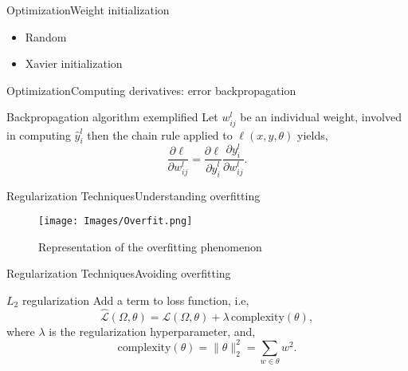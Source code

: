 \documentclass{beamer}
\newcommand{\loss}{\mathcal{L}}
\begin{document}
\begin{frame}{Optimization}{Weight initialization}
  \begin{itemize}
    \item Random
    \item Xavier initialization
  \end{itemize}
\end{frame}

\begin{frame}{Optimization}{Computing derivatives: error backpropagation}
  \begin{block}{Backpropagation algorithm exemplified}
    Let \(w_ {ij} ^ l\) be an individual weight, involved in computing
    \(\hat{y}_i^l\) then the \alert{chain rule} applied to
    \(\ell (x, y, \theta)\) yields,
    \begin{equation}
      \frac{\partial \ell}{\partial w_{ij}^l} =
      \frac{\partial \ell}{\partial \hat{y}_i^l}
      \frac{\partial y_i^l}{\partial w_{ij}^l}.
    \end{equation}
  \end{block}
  \begin{center}
    \resizebox{.6\textwidth}{!}{
      
    }
  \end{center}
\end{frame}

\begin{frame}{Regularization Techniques}{Understanding overfitting}
  \begin{figure}
    \texttt{[image: Images/Overfit.png]}
    \caption{Representation of the overfitting phenomenon}
  \end{figure}
\end{frame}

\begin{frame}{Regularization Techniques}{Avoiding overfitting}
  \begin{block}{\(L_2\) regularization}
    Add a term to loss function, i.e,
    \begin{equation}
      \hat{\loss}(\Omega, \theta) =
      \loss(\Omega, \theta) + \lambda\,\text{complexity}(\theta),
    \end{equation}
    where \(\lambda\) is the regularization hyperparameter, and,
    \begin{equation}
      \text{complexity}(\theta) = \lVert\theta\rVert_2^2 = \sum_{w \in \theta} w^2.
    \end{equation}
  \end{block}
\end{frame}
\end{document}
